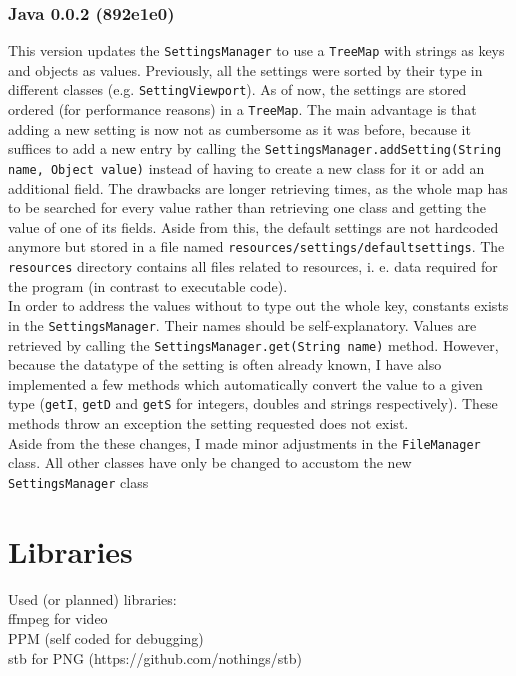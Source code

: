 \documentclass[10pt,a4paper,titlepage]{article}
\begin{document}
	\subsubsection{Java 0.0.2 (892e1e0)}
	This version updates the \verb|SettingsManager| to use a \verb|TreeMap| with strings as keys and objects as values. Previously, all the settings were sorted by their type in different classes (e.g. \verb|SettingViewport|). As of now, the settings are stored ordered (for performance reasons) in a \verb|TreeMap|. The main advantage is that adding a new setting is now not as cumbersome as it was before, because it suffices to add a new entry by calling the \verb|SettingsManager.addSetting(String name, Object value)| instead of having to create a new class for it or add an additional field. The drawbacks are longer retrieving times, as the whole map has to be searched for every value rather than retrieving one class and getting the value of one of its fields. Aside from this, the default settings are not hardcoded anymore but stored in a file named \verb|resources/settings/defaultsettings|. The \verb|resources| directory contains all files related to resources, i. e. data required for the program (in contrast to executable code).\\
	In order to address the values without to type out the whole key, constants exists in the \verb|SettingsManager|. Their names should be self-explanatory. Values are retrieved by calling the \verb|SettingsManager.get(String name)| method. However, because the datatype of the setting is often already known, I have also implemented a few methods which automatically convert the value to a given type (\verb|getI|, \verb|getD| and \verb|getS| for integers, doubles and strings respectively). These methods throw an exception the setting requested does not exist.\\
	Aside from the these changes, I made minor adjustments in the \verb|FileManager| class. All other classes have only be changed to accustom the new \verb|SettingsManager| class

	\section{Libraries}
	Used (or planned) libraries:\\
	ffmpeg for video\\
	PPM (self coded for debugging)\\
	stb for PNG (https://github.com/nothings/stb)\\
\end{document}
